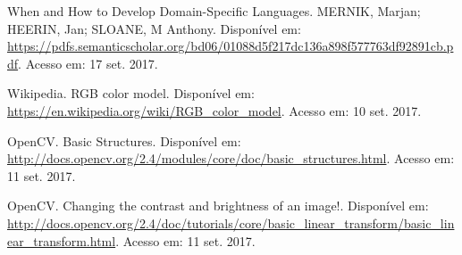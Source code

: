 \documentclass[a4paper, 10pt, conference]{ieeeconf}
\begin{document}
\begin{thebibliography}{99}

 When and How to Develop Domain-Specific Languages. MERNIK, Marjan; HEERIN, Jan; SLOANE, M Anthony. Disponível em: \url{https://pdfs.semanticscholar.org/bd06/01088d5f217dc136a898f577763df92891cb.pdf}. Acesso em: 17 set. 2017.


 Wikipedia. RGB color model. Disponível em: \url{https://en.wikipedia.org/wiki/RGB_color_model}. Acesso em: 10 set. 2017.

 OpenCV. Basic Structures. Disponível em: \url{http://docs.opencv.org/2.4/modules/core/doc/basic_structures.html}. Acesso em: 11 set. 2017.

 OpenCV. Changing the contrast and brightness of an image!. Disponível em: \url{http://docs.opencv.org/2.4/doc/tutorials/core/basic_linear_transform/basic_linear_transform.html}. Acesso em: 11 set. 2017.

\end{thebibliography}
\end{document}
